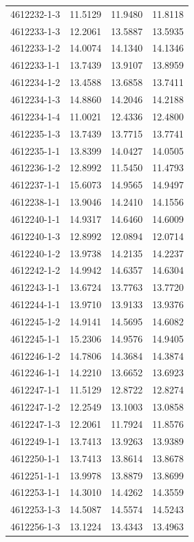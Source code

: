 \begin{longtable}{lrrr}
4612232-1-3 & 11.5129 & 11.9480 & 11.8118 \\
4612233-1-3 & 12.2061 & 13.5887 & 13.5935 \\
4612233-1-2 & 14.0074 & 14.1340 & 14.1346 \\
4612233-1-1 & 13.7439 & 13.9107 & 13.8959 \\
4612234-1-2 & 13.4588 & 13.6858 & 13.7411 \\
4612234-1-3 & 14.8860 & 14.2046 & 14.2188 \\
4612234-1-4 & 11.0021 & 12.4336 & 12.4800 \\
4612235-1-3 & 13.7439 & 13.7715 & 13.7741 \\
4612235-1-1 & 13.8399 & 14.0427 & 14.0505 \\
4612236-1-2 & 12.8992 & 11.5450 & 11.4793 \\
4612237-1-1 & 15.6073 & 14.9565 & 14.9497 \\
4612238-1-1 & 13.9046 & 14.2410 & 14.1556 \\
4612240-1-1 & 14.9317 & 14.6460 & 14.6009 \\
4612240-1-3 & 12.8992 & 12.0894 & 12.0714 \\
4612240-1-2 & 13.9738 & 14.2135 & 14.2237 \\
4612242-1-2 & 14.9942 & 14.6357 & 14.6304 \\
4612243-1-1 & 13.6724 & 13.7763 & 13.7720 \\
4612244-1-1 & 13.9710 & 13.9133 & 13.9376 \\
4612245-1-2 & 14.9141 & 14.5695 & 14.6082 \\
4612245-1-1 & 15.2306 & 14.9576 & 14.9405 \\
4612246-1-2 & 14.7806 & 14.3684 & 14.3874 \\
4612246-1-1 & 14.2210 & 13.6652 & 13.6923 \\
4612247-1-1 & 11.5129 & 12.8722 & 12.8274 \\
4612247-1-2 & 12.2549 & 13.1003 & 13.0858 \\
4612247-1-3 & 12.2061 & 11.7924 & 11.8576 \\
4612249-1-1 & 13.7413 & 13.9263 & 13.9389 \\
4612250-1-1 & 13.7413 & 13.8614 & 13.8678 \\
4612251-1-1 & 13.9978 & 13.8879 & 13.8699 \\
4612253-1-1 & 14.3010 & 14.4262 & 14.3559 \\
4612253-1-3 & 14.5087 & 14.5574 & 14.5243 \\
4612256-1-3 & 13.1224 & 13.4343 & 13.4963 \\

\end{longtable}
